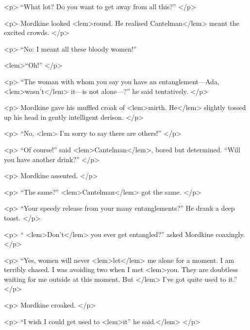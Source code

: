 {{				<p>
				“What lot? Do you want to get away from all this?” 
 				</p> 

				<p>
				Mordkine looked 
<lem>round. He realised Cantelman</lem>
					{} 
				meant the excited crowds. 
 				</p> 

				<p>
				“No: I meant all these bloody women!” 
				
<lem>“Oh!” 
					{} 
				</p> 

				<p>
				“The woman with whom you say you have an entanglement---Ada, 
<lem>wasn't</lem>
					{} 
				it---is not alone---?” 
				he said tentatively. 
 				</p> 

				<p>
				Mordkine gave his muffled croak of 
<lem>mirth. He</lem>
					{} 
				slightly tossed up his head in gently 
				intelligent derison. 
 				</p> 

				<p>
				“No, 
<lem>
					{} 
				I'm sorry to say there are others!” 
 				</p> 

				<p>
				“Of course!” said 
<lem>Cantelman</lem>{}, bored but determined. “Will you have another drink?” 
				</p> 

				<p>
				Mordkine assented.
				</p> 

				<p>
				“The same?” 
<lem>Cantelman</lem>{} got the same. 
				</p> 

				<p>
				“Your speedy release from your many entanglements?” He drank a deep toast. 
				</p> 

				<p>
“
<lem>Don't</lem>{} you ever get entangled?” asked Mordkine coaxingly. 
				</p> 
 
				<p>
				“Yes, women will never 
<lem>let</lem>
					{} 
				me alone for a moment. I am terribly chased. I was 
				avoiding two when I met 
<lem>you. They are doubtless waiting for me outside at this moment. But </lem>
					{} 
				I've got quite used to it.” 
 				</p> 

				<p>
				Mordkine croaked. 
 				</p> 

				<p>
				“I wish I could get used to 
<lem>it” he said.</lem>
					{}
 				</p> 

}}
